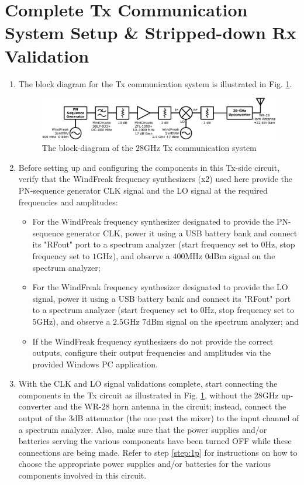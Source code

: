 \documentclass[12pt, draftcls, onecolumn]{IEEEtran}
\begin{document}
\section{Complete Tx Communication System Setup \& Stripped-down Rx Validation}
\begin{enumerate}
    \item The block diagram for the Tx communication system is illustrated in Fig. \ref{fig:8}.
    \begin{figure}
        \centering
        \includegraphics[width=1.0\linewidth]{14.png}
        \caption{The block-diagram of the $28$GHz Tx communication system}
        \label{fig:8}
    \end{figure}
    \item Before setting up and configuring the components in this Tx-side circuit, verify that the WindFreak frequency synthesizers (x2) used here provide the PN-sequence generator CLK signal and the LO signal at the required frequencies and amplitudes:
    \begin{itemize}
        \item For the WindFreak frequency synthesizer designated to provide the PN-sequence generator CLK, power it using a USB battery bank and connect its "RFout" port to a spectrum analyzer (start frequency set to $0$Hz, stop frequency set to $1$GHz), and observe a $400$MHz $0$dBm signal on the spectrum analyzer;
        \item For the WindFreak frequency synthesizer designated to provide the LO signal, power it using a USB battery bank and connect its "RFout" port to a spectrum analyzer (start frequency set to $0$Hz, stop frequency set to $5$GHz), and observe a $2.5$GHz $7$dBm signal on the spectrum analyzer; and
        \item If the WindFreak frequency synthesizers do not provide the correct outputs, configure their output frequencies and amplitudes via the provided Windows PC application.
    \end{itemize}
    \item With the CLK and LO signal validations complete, start connecting the components in the Tx circuit as illustrated in Fig. \ref{fig:8}, without the $28$GHz up-converter and the WR-$28$ horn antenna in the circuit; instead, connect the output of the $3$dB attenuator (the one past the mixer) to the input channel of a spectrum analyzer. Also, make sure that the power supplies and/or batteries serving the various components have been turned OFF while these connections are being made. Refer to step \ref{step:1p} for instructions on how to choose the appropriate power supplies and/or batteries for the various components involved in this circuit.

\end{enumerate}
\end{document}
